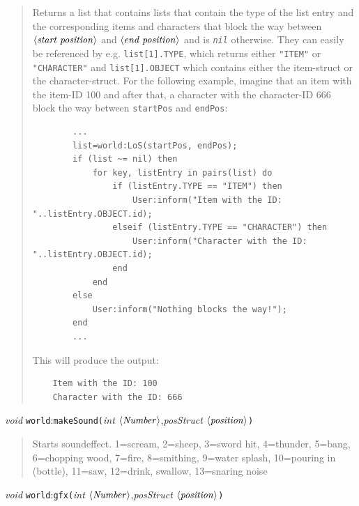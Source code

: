 \documentclass[a4paper,10pt,makeidx]{scrreprt}
\newcommand{\com}[2]{\index{#1}\texttt{#1(}#2\texttt{)}}
\newcommand{\comm}[1]{\index{#1}\texttt{#1}}
\newcommand{\var}[1]{$\left\langle \text{\emph{#1}} \right\rangle$}
\newcommand{\lua}[1]{\index{#1}\texttt{\emph{#1}}}
\newcommand{\void}{\textsl{void }}
\newcommand{\integer}{\textsl{int }}
\newcommand{\position}{\textsl{posStruct }}
\begin{document}
\begin{quote}
    Returns a list that contains lists that contain the type of the list entry and the corresponding items and characters that block the way between \var{start position} and \var{end position} and is \lua{nil} otherwise. They can easily be referenced by e.g. \texttt{list[1].TYPE}, which returns either \texttt{"ITEM"} or \texttt{"CHARACTER"} and \texttt{list[1].OBJECT} which contains either the item-struct or the character-struct. For the following example, imagine that an item with the item-ID 100 and after that, a character with the character-ID 666 block the way between \texttt{startPos} and \texttt{endPos}:
    \begin{verbatim}
        ...
        list=world:LoS(startPos, endPos);
        if (list ~= nil) then
            for key, listEntry in pairs(list) do
                if (listEntry.TYPE == "ITEM") then
                    User:inform("Item with the ID: "..listEntry.OBJECT.id);
                elseif (listEntry.TYPE == "CHARACTER") then
                    User:inform("Character with the ID: "..listEntry.OBJECT.id);
                end
            end
        else
            User:inform("Nothing blocks the way!");
        end
        ...
    \end{verbatim}
    This will produce the output:
    \begin{verbatim}
    Item with the ID: 100
    Character with the ID: 666
    \end{verbatim}
\end{quote}
\void \comm{world}:\com{makeSound}{\integer \var{Number},\position \var{position}}

\begin{quote}
       Starts soundeffect.
       1=scream, 2=sheep, 3=sword hit, 4=thunder, 5=bang, 6=chopping wood, 7=fire, 8=smithing, 9=water splash, 10=pouring in (bottle), 11=saw, 12=drink, swallow, 13=snaring noise
\end{quote}
\void \comm{world}:\com{gfx}{\integer \var{Number},\position \var{position}}
\end{document}
